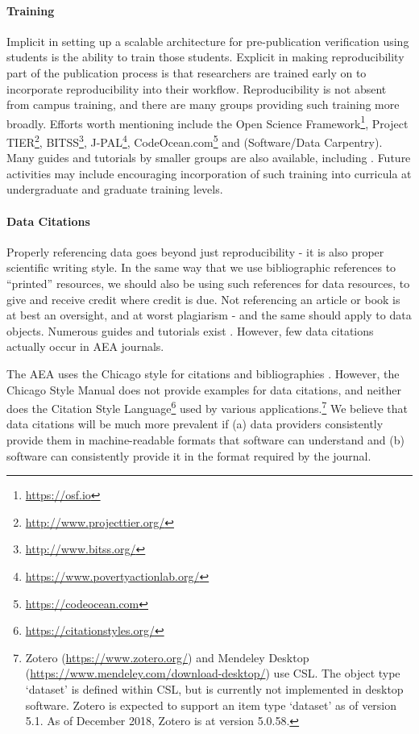 \documentclass[PP]{AEA}
\newcommand{\urlcite}[2]{#2\footnote{\url{#1}}}
\newcommand{\furlcite}[2]{#2 (\url{#1})}
\begin{document}
\paragraph{Training}

Implicit in setting up a scalable architecture for pre-publication verification using students is the ability to train those students. Explicit in making reproducibility part of the publication process is that researchers are trained early on to incorporate reproducibility into their workflow. Reproducibility is not absent from campus training, and there are many groups providing such training more broadly. Efforts worth mentioning include the  \urlcite{https://osf.io}{Open Science Framework}, \urlcite{http://www.projecttier.org/}{Project TIER}, \urlcite{http://www.bitss.org/}{BITSS}, \urlcite{https://www.povertyactionlab.org/}{J-PAL}, \urlcite{https://codeocean.com}{CodeOcean.com} and (Software/Data Carpentry). Many guides and tutorials by smaller groups are also available, including \cite{Gentzkow2014,Wilson2016-bt,Vilhuber2018}. Future activities may include encouraging incorporation of such training into curricula at undergraduate and graduate training levels. 




\paragraph{Data Citations}
Properly referencing data goes beyond just reproducibility - it is also proper scientific writing style. In the same way that we use bibliographic references to ``printed'' resources, we should also be using such references for data resources, to give and receive credit where credit is due. Not referencing an article or book is at best an oversight, and at worst plagiarism - and the same should apply to data objects. Numerous guides and tutorials exist  \citep{dataone-l09,icpsr-data-cite,force11declaration}. However, few data citations actually occur in AEA journals.

The AEA uses the Chicago style for citations and bibliographies \citep{aeadatarefs}. However, the Chicago Style Manual \citep{citation-machine,ChicagoManualofStyleChicagoManualStyle2018} does not provide examples for data citations, and neither does the \urlcite{https://citationstyles.org/}{Citation Style Language} used by various applications.\footnote{\furlcite{https://www.zotero.org/}{Zotero} and \furlcite{https://www.mendeley.com/download-desktop/}{Mendeley Desktop} use CSL.%
The object type `dataset' is defined within CSL, but is currently not implemented in desktop software. Zotero is expected to support an item type `dataset' as of version 5.1. As of December 2018, Zotero is at version 5.0.58.}
We believe that data citations will be much more prevalent if (a) data providers consistently provide them in machine-readable formats that software can understand and (b) software can consistently provide it in the format required by the journal.
\end{document}
